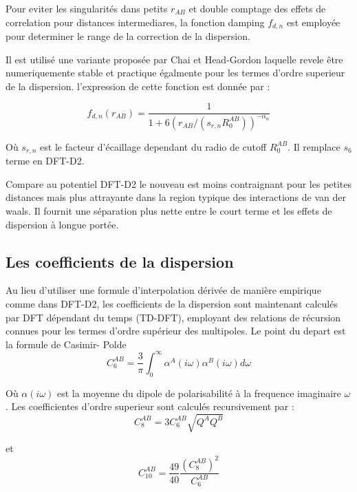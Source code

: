 	Pour eviter les singularités dans petits $r_{AB}$ et double comptage des effets de correlation pour distances intermediares, la fonction damping $f_{d,n}$ est employée pour determiner le range de la correction de la dispersion.
	\bigskip
	
	Il est utilisé une variante proposée par Chai et Head-Gordon\cite{chai2008long} laquelle revele être numeriquemente stable et practique égalmente pour les termes d'ordre superieur de la dispersion. l'expression de cette fonction est donnée par :
	
	\begin{equation}
	f_{d,n} (r_{AB}) = \frac{1}{1+ 6(r_{AB}/(s_{r,n}R_{0}^{AB}))^{-\alpha_{n}}}
	\end{equation}
	\bigskip
	
	Où $s_{r,n}$ est le facteur d'écaillage dependant du radio de cutoff $R_{0}^{AB}$. Il remplace $s_{6}$ terme en DFT-D2. 
	\bigskip
	
	Compare au potentiel DFT-D2 le nouveau est moins contraignant pour les petites distances
	mais plus attrayante dans la region typique des interactions de van der waals. Il fournit une séparation plus nette entre le court terme et les effets de dispersion à longue portée.
	
	\subsection{Les coefficients de la dispersion}
	
	
	Au lieu d'utiliser une formule d'interpolation dérivée de manière empirique comme dans DFT-D2, les coefficients de la dispersion sont maintenant calculés par DFT dépendant du temps (TD-DFT), employant des relations de récursion connues pour les termes d'ordre supérieur des multipoles. Le point du depart est la formule de Casimir- Polde\cite{kaplan2006intermolecular} 
	\bigskip
	\begin{equation}
	C_{6}^{AB} = \frac{3}{\pi}\int_{0}^{\infty} \alpha^{A} (i\omega) \alpha^{B} (i\omega) d\omega
	\end{equation}
	\bigskip
	
	Où $\alpha(i\omega)$ est la moyenne du dipole de polarisabilité à la frequence imaginaire $\omega$. Les coefficientes d'ordre superieur sont calculés recursivement par :
	\bigskip
	\begin{equation}
	C_{8}^{AB} = 3C_{6}^{AB} \sqrt{Q^{A}Q^{B}}
	\end{equation}
	
	et \begin{equation}
	C_{10}^{AB} =\frac{49}{40} \frac{(C_{8}^{AB})^{2}}{C_{6}^{AB}}
	\end{equation}
	
